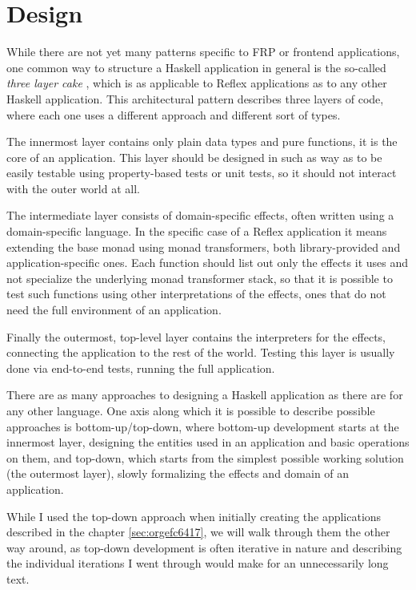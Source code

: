 \documentclass[english,odsaz]{fitthesis}
\begin{document}
\section{Design}
\label{sec:orgf78f623}
While there are not yet many patterns specific to FRP or frontend applications,
one common way to structure a Haskell application in general is the so-called
\emph{three layer cake} \cite{three-layer}, which is as applicable to Reflex applications as
to any other Haskell application. This architectural pattern describes three
layers of code, where each one uses a different approach and different sort of
types.

The innermost layer contains only plain data types and pure functions, it is the
core of an application. This layer should be designed in such as way as to be
easily testable using property-based tests or unit tests, so it should not
interact with the outer world at all.

The intermediate layer consists of domain-specific effects, often written using
a domain-specific language. In the specific case of a Reflex application it
means extending the base monad using monad transformers, both library-provided
and application-specific ones. Each function should list out only the effects it
uses and not specialize the underlying monad transformer stack, so that it is
possible to test such functions using other interpretations of the effects, ones
that do not need the full environment of an application.

Finally the outermost, top-level layer contains the interpreters for the
effects, connecting the application to the rest of the world. Testing this layer
is usually done via end-to-end tests, running the full application.

There are as many approaches to designing a Haskell application as there are for
any other language. One axis along which it is possible to describe possible
approaches is bottom-up/top-down, where bottom-up development starts at the
innermost layer, designing the entities used in an application and basic
operations on them, and top-down, which starts from the simplest possible
working solution (the outermost layer), slowly formalizing the effects and
domain of an application.

While I used the top-down approach when initially creating the applications
described in the chapter \ref{sec:orgefc6417}, we will walk through them the other way
around, as top-down development is often iterative in nature and describing the
individual iterations I went through would make for an unnecessarily long text.
\end{document}
